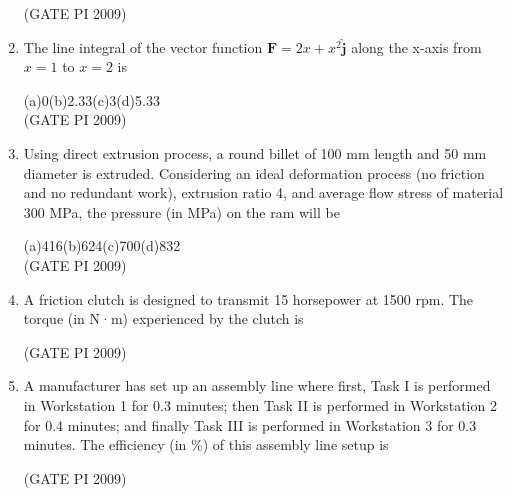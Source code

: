 \documentclass[journal,12pt,onecolumn]{IEEEtran}
\theoremstyle{remark}
\begin{document}
\begin{enumerate}[label=Q.\arabic*]
\begin{enumerate}
\end{enumerate}
\hfill (GATE PI 2009)
\item The line integral of the vector function $\mathbf{F} = 2x + x^2 \mathbf{\hat{j}}$ along the x-axis from $x=1$ to $x=2$ is

(a)0\hfill(b)2.33\hfill(c)3\hfill(d)5.33 \\

\hfill (GATE PI 2009)
\item Using direct extrusion process, a round billet of 100 mm length and 50 mm diameter is extruded. Considering an ideal deformation process (no friction and no redundant work), extrusion ratio 4, and average flow stress of material 300 MPa, the pressure (in MPa) on the ram will be

(a)416\hfill(b)624\hfill(c)700\hfill(d)832\\

\hfill (GATE PI 2009)
\item A friction clutch is designed to transmit 15 horsepower at 1500 rpm. The torque (in N·m) experienced by the clutch is
\begin{enumerate}
\end{enumerate}
\hfill (GATE PI 2009)
\item A manufacturer has set up an assembly line where first, Task I is performed in Workstation 1 for 0.3 minutes; then Task II is performed in Workstation 2 for 0.4 minutes; and finally Task III is performed in Workstation 3 for 0.3 minutes. The efficiency (in \%) of this assembly line setup is
\begin{enumerate}
\end{enumerate}
\hfill (GATE PI 2009)


\end{enumerate}
\end{document}
